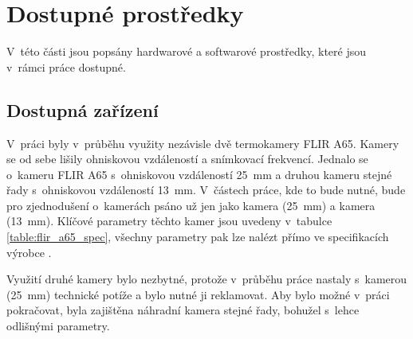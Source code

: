 \section{Dostupné prostředky}
V~této části jsou popsány hardwarové a softwarové prostředky, které jsou v~rámci práce dostupné.

	\subsection{Dostupná zařízení}\label{sec:used_equip}
 	V~práci byly v~průběhu využity nezávisle dvě termokamery FLIR A65. Kamery se od sebe lišily ohniskovou vzdáleností a snímkovací frekvencí. Jednalo se o~kameru FLIR A65 s~ohniskovou vzdáleností 25~mm a druhou kameru stejné řady s~ohniskovou vzdáleností 13~mm. V~částech práce, kde to bude nutné, bude pro zjednodušení o~kamerách psáno už jen jako kamera (25~mm) a kamera (13~mm). Klíčové parametry těchto kamer jsou uvedeny v~tabulce \ref{table:flir_a65_spec}, všechny parametry pak lze nalézt přímo ve specifikacích výrobce \cite{flirA65Spec}.

    Využití druhé kamery bylo nezbytné, protože v~průběhu práce nastaly s~kamerou (25~mm) technické potíže a bylo nutné ji reklamovat. Aby bylo možné v~práci pokračovat, byla zajištěna náhradní kamera stejné řady, bohužel s~lehce odlišnými parametry. 
  
